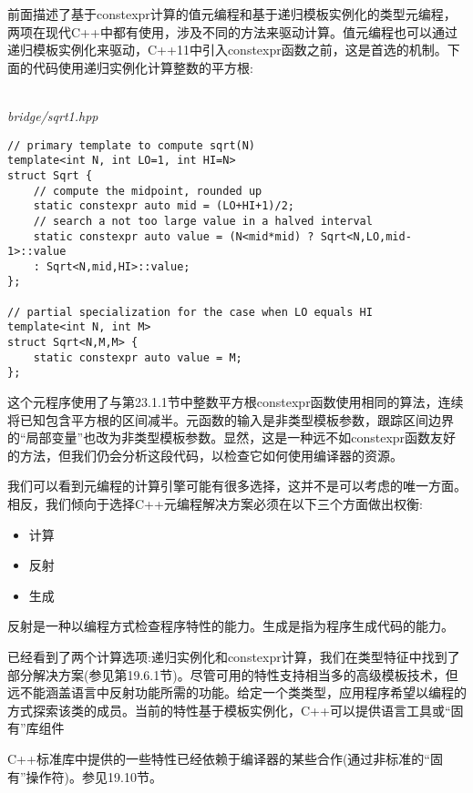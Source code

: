 前面描述了基于constexpr计算的值元编程和基于递归模板实例化的类型元编程，两项在现代C++中都有使用，涉及不同的方法来驱动计算。值元编程也可以通过递归模板实例化来驱动，C++11中引入constexpr函数之前，这是首选的机制。下面的代码使用递归实例化计算整数的平方根:

\hspace*{\fill} \\ %
\noindent
\textit{bridge/sqrt1.hpp}
\begin{lstlisting}[style=styleCXX]
// primary template to compute sqrt(N)
template<int N, int LO=1, int HI=N>
struct Sqrt {
	// compute the midpoint, rounded up
	static constexpr auto mid = (LO+HI+1)/2;
	// search a not too large value in a halved interval
	static constexpr auto value = (N<mid*mid) ? Sqrt<N,LO,mid-1>::value
	: Sqrt<N,mid,HI>::value;
};

// partial specialization for the case when LO equals HI
template<int N, int M>
struct Sqrt<N,M,M> {
	static constexpr auto value = M;
};
\end{lstlisting}

这个元程序使用了与第23.1.1节中整数平方根constexpr函数使用相同的算法，连续将已知包含平方根的区间减半。元函数的输入是非类型模板参数，跟踪区间边界的“局部变量”也改为非类型模板参数。显然，这是一种远不如constexpr函数友好的方法，但我们仍会分析这段代码，以检查它如何使用编译器的资源。

我们可以看到元编程的计算引擎可能有很多选择，这并不是可以考虑的唯一方面。相反，我们倾向于选择C++元编程解决方案必须在以下三个方面做出权衡:

\begin{itemize}
\item 
计算

\item 
反射

\item 
生成
\end{itemize}

反射是一种以编程方式检查程序特性的能力。生成是指为程序生成代码的能力。

已经看到了两个计算选项:递归实例化和constexpr计算，我们在类型特征中找到了部分解决方案(参见第19.6.1节)。尽管可用的特性支持相当多的高级模板技术，但远不能涵盖语言中反射功能所需的功能。给定一个类类型，应用程序希望以编程的方式探索该类的成员。当前的特性基于模板实例化，C++可以提供语言工具或“固有”库组件

\begin{tcolorbox}[colback=webgreen!5!white,colframe=webgreen!75!black]
\hspace*{0.75cm}C++标准库中提供的一些特性已经依赖于编译器的某些合作(通过非标准的“固有”操作符)。参见19.10节。
\end{tcolorbox}

